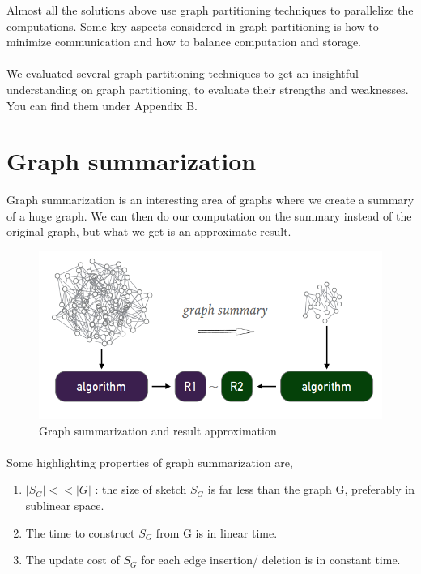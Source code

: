 \documentclass[12pt]{report}
\numberwithin{figure}{section}
\numberwithin{table}{section}
\begin{document}
Almost all the solutions above use graph partitioning techniques to parallelize the computations. Some key aspects considered in graph partitioning is how to minimize communication and how to balance computation and storage. 

\paragraph{}

We evaluated several graph partitioning techniques to get an insightful understanding on graph partitioning, to evaluate their strengths and weaknesses. You can find them under Appendix B. 

\section{Graph summarization}
Graph summarization is an interesting area of graphs where we create a summary of a huge graph. We can then do our computation on the summary instead of the original graph, but what we get is an approximate result. 

\begin{figure}[H]
\centering
\includegraphics[scale=0.6]{images/image02}
\caption{Graph summarization and result approximation}
\end{figure}

\paragraph{}
Some highlighting properties of graph summarization are, 

\begin{enumerate}

\item $ | S_G | << | G |$ : the size of sketch $S_G$ is far less than the graph G, preferably in sublinear space.
\item The time to construct $S_G$ from G is in linear time.
\item The update cost of $S_G$ for each edge insertion/ deletion is in constant time.

\end{enumerate}
\end{document}
